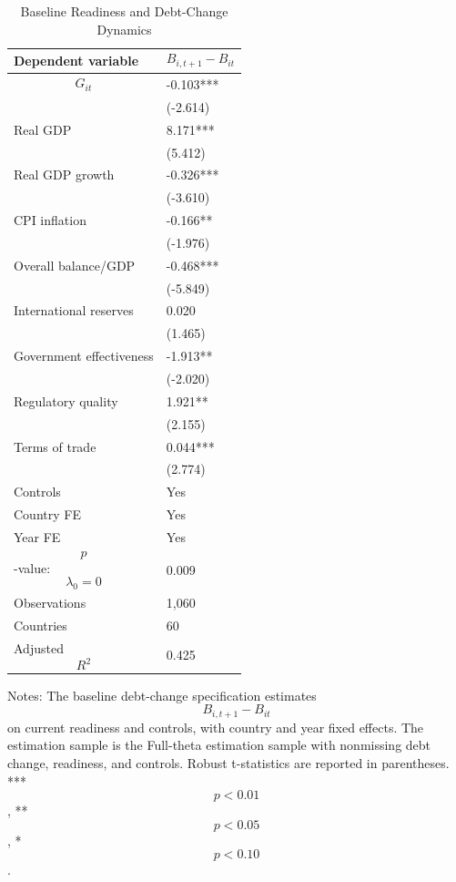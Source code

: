 \begin{table}[H]\centering
\begin{threeparttable}
\caption{Baseline Readiness and Debt-Change Dynamics}
\label{tab:baseline_debt_change_readiness}
\scriptsize
\begin{tabularx}{\textwidth}{lY}
\toprule
Dependent variable & $$B_{i,t+1}-B_{it}$$ \\
\midrule
$$G_{it}$$ & -0.103*** \\
 & (-2.614) \\
Real GDP & 8.171*** \\
 & (5.412) \\
Real GDP growth & -0.326*** \\
 & (-3.610) \\
CPI inflation & -0.166** \\
 & (-1.976) \\
Overall balance/GDP & -0.468*** \\
 & (-5.849) \\
International reserves & 0.020 \\
 & (1.465) \\
Government effectiveness & -1.913** \\
 & (-2.020) \\
Regulatory quality & 1.921** \\
 & (2.155) \\
Terms of trade & 0.044*** \\
 & (2.774) \\
\midrule
Controls & Yes \\
Country FE & Yes \\
Year FE & Yes \\
$$p$$-value: $$\lambda_0=0$$ & 0.009 \\
Observations & 1,060 \\
Countries & 60 \\
Adjusted $$R^2$$ & 0.425 \\
\bottomrule
\end{tabularx}
\begin{tablenotes}[flushleft]\footnotesize
\item Notes: The baseline debt-change specification estimates $$B_{i,t+1}-B_{it}$$ on current readiness and controls, with country and year fixed effects. The estimation sample is the Full-theta estimation sample with nonmissing debt change, readiness, and controls. Robust t-statistics are reported in parentheses. *** $$p<0.01$$, ** $$p<0.05$$, * $$p<0.10$$.
\end{tablenotes}
\end{threeparttable}
\end{table}
